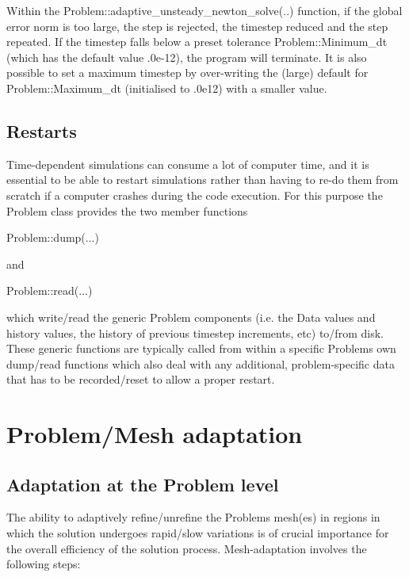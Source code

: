 Within the {\ttfamily Problem\+::adaptive\+\_\+unsteady\+\_\+newton\+\_\+solve}(..) function, if the global error norm is too large, the step is rejected, the timestep reduced and the step repeated. If the timestep falls below a preset tolerance {\ttfamily Problem\+::\+Minimum\+\_\+dt} (which has the default value {.\+0e-\/12}), the program will terminate. It is also possible to set a maximum timestep by over-\/writing the (large) default for {\ttfamily Problem\+::\+Maximum\+\_\+dt} (initialised to {.\+0e12}) with a smaller value.\hypertarget{index_restarts}{}\subsection{Restarts}\label{index_restarts}
Time-\/dependent simulations can consume a lot of computer time, and it is essential to be able to restart simulations rather than having to re-\/do them from scratch if a computer crashes during the code execution. For this purpose the {\ttfamily Problem} class provides the two member functions 
\begin{DoxyCode}
Problem::dump(...) 
\end{DoxyCode}
 and 
\begin{DoxyCode}
Problem::read(...) 
\end{DoxyCode}
 which write/read the generic {\ttfamily Problem} components (i.\+e. the {\ttfamily Data} values and history values, the history of previous timestep increments, etc) to/from disk. These generic functions are typically called from within a specific {\ttfamily Problem\textquotesingle{}s} own dump/read functions which also deal with any additional, problem-\/specific data that has to be recorded/reset to allow a proper restart.\hypertarget{index_mesh_refinement}{}\section{Problem/\+Mesh adaptation}\label{index_mesh_refinement}
\hypertarget{index_RefineableProblems}{}\subsection{Adaptation at the Problem level}\label{index_RefineableProblems}
The ability to adaptively refine/unrefine the {\ttfamily Problem\textquotesingle{}s} mesh(es) in regions in which the solution undergoes rapid/slow variations is of crucial importance for the overall efficiency of the solution process. Mesh-\/adaptation involves the following steps\+:
